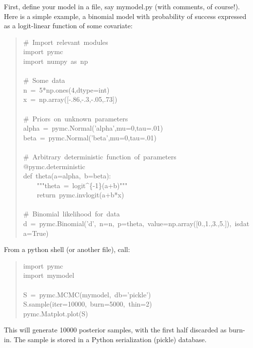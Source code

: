 First, define your model in a file, say mymodel.py (with comments, of course!). Here is a simple example, a binomial model with probability of success expressed as a logit-linear function of some covariate:
\begin{quote}{\ttfamily \raggedright \noindent
{\#}~Import~relevant~modules~\\
import~pymc~\\
import~numpy~as~np~\\
~\\
{\#}~Some~data~\\
n~=~5*np.ones(4,dtype=int)~\\
x~=~np.array({[}-.86,-.3,-.05,.73])~\\
~\\
{\#}~Priors~on~unknown~parameters~\\
alpha~=~pymc.Normal('alpha',mu=0,tau=.01)~\\
beta~=~pymc.Normal('beta',mu=0,tau=.01)~~~~\\
~\\
{\#}~Arbitrary~deterministic~function~of~parameters~\\
@pymc.deterministic~\\
def~theta(a=alpha,~b=beta):~\\
~~~~"{}"{}"theta~=~logit{\textasciicircum}{\{}-1{\}}(a+b)"{}"{}"~\\
~~~~return~pymc.invlogit(a+b*x)~\\
~\\
{\#}~Binomial~likelihood~for~data~\\
d~=~pymc.Binomial('d',~n=n,~p=theta,~value=np.array({[}0.,1.,3.,5.]),~isdata=True)
}\end{quote}

From a python shell (or another file), call:
\begin{quote}{\ttfamily \raggedright \noindent
import~pymc~\\
import~mymodel~\\
~\\
S~=~pymc.MCMC(mymodel,~db='pickle')~\\
S.sample(iter=10000,~burn=5000,~thin=2)~\\
pymc.Matplot.plot(S)
}\end{quote}

This will generate 10000 posterior samples, with the first half discarded as burn-in. The sample is stored in a Python serialization (pickle) database.



